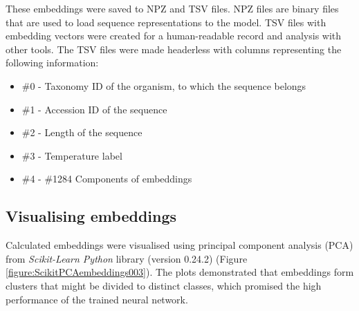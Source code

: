 \documentclass[12pt]{article}
\begin{document}
	These embeddings were saved to NPZ and TSV files. NPZ files are binary 
	files that are used to load sequence representations to the model. TSV 
	files with embedding vectors were created for a human-readable record 
	and analysis with other tools. The TSV files were made headerless with 
	columns representing the following information:

	\begin{itemize}
		\item \#0 - Taxonomy ID of the organism, to which the sequence belongs
		\item \#1 - Accession ID of the sequence
		\item \#2 - Length of the sequence
		\item \#3 - Temperature label
		\item \#4 - \#1284 Components of embeddings
	  \end{itemize}

	\subsection{Visualising embeddings}

	Calculated embeddings were visualised using principal component 
	analysis (PCA) from \textit{Scikit-Learn Python} library (version 0.24.2)
	(Figure \ref{figure:ScikitPCAembeddings003}). The plots demonstrated that
	embeddings form clusters that might be divided to distinct classes, which
	promised the high performance of the trained neural network.
\end{document}
